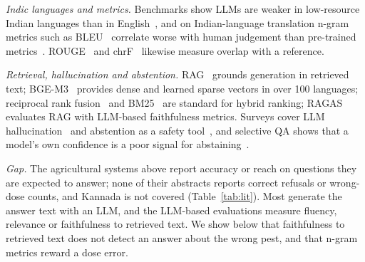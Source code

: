 \documentclass[conference]{IEEEtran}
\begin{document}
\textit{Indic languages and metrics.} Benchmarks show LLMs are weaker in low-resource Indian
languages than in English~\cite{singh2024indicqa,rohera2024indicquest,singh2024indicgenbench},
and on Indian-language translation n-gram metrics such as BLEU~\cite{papineni2002bleu}
correlate worse with human judgement than pre-trained metrics~\cite{sai2023indicmteval}.
ROUGE~\cite{lin2004rouge} and chrF~\cite{popovic2015chrf} likewise measure overlap with a
reference.

\textit{Retrieval, hallucination and abstention.} RAG~\cite{lewis2020rag} grounds generation
in retrieved text; BGE-M3~\cite{chen2024bgem3} provides dense and learned sparse vectors in
over 100 languages; reciprocal rank fusion~\cite{cormack2009rrf} and BM25~\cite{robertson2009bm25}
are standard for hybrid ranking; RAGAS~\cite{es2023ragas} evaluates RAG with LLM-based
faithfulness metrics. Surveys cover LLM hallucination~\cite{huang2024hallucination} and
abstention as a safety tool~\cite{wen2025abstention}, and selective QA shows that a model's own
confidence is a poor signal for abstaining~\cite{kamath2020selective}.

\textit{Gap.} The agricultural systems above report accuracy or reach on questions they are
expected to answer; none of their abstracts reports correct refusals or wrong-dose counts,
and Kannada is not covered (Table~\ref{tab:lit}). Most generate the answer text with an LLM,
and the LLM-based evaluations measure fluency, relevance or faithfulness to retrieved text.
We show below that faithfulness to retrieved text does not detect an answer about the wrong
pest, and that n-gram metrics reward a dose error.
\end{document}
